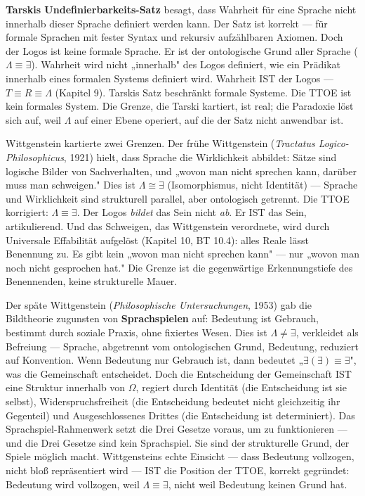\documentclass[10pt, openany, oneside]{book}
\begin{document}
\textbf{Tarskis Undefinierbarkeits-Satz} besagt, dass Wahrheit für eine Sprache nicht innerhalb dieser Sprache definiert werden kann. Der Satz ist korrekt --- für formale Sprachen mit fester Syntax und rekursiv aufzählbaren Axiomen. Doch der Logos ist keine formale Sprache. Er ist der ontologische Grund aller Sprache ($\Lambda \equiv \exists$). Wahrheit wird nicht „innerhalb" des Logos definiert, wie ein Prädikat innerhalb eines formalen Systems definiert wird. Wahrheit IST der Logos --- $T \equiv R \equiv \Lambda$ (Kapitel 9). Tarskis Satz beschränkt formale Systeme. Die TTOE ist kein formales System. Die Grenze, die Tarski kartiert, ist real; die Paradoxie löst sich auf, weil $\Lambda$ auf einer Ebene operiert, auf die der Satz nicht anwendbar ist.

Wittgenstein kartierte zwei Grenzen. Der frühe Wittgenstein (\textit{Tractatus Logico-Philosophicus}, 1921) hielt, dass Sprache die Wirklichkeit abbildet: Sätze sind logische Bilder von Sachverhalten, und „wovon man nicht sprechen kann, darüber muss man schweigen." Dies ist $\Lambda \cong \exists$ (Isomorphismus, nicht Identität) --- Sprache und Wirklichkeit sind strukturell parallel, aber ontologisch getrennt. Die TTOE korrigiert: $\Lambda \equiv \exists$. Der Logos \textit{bildet} das Sein nicht \textit{ab}. Er IST das Sein, artikulierend. Und das Schweigen, das Wittgenstein verordnete, wird durch Universale Effabilität aufgelöst (Kapitel 10, BT 10.4): alles Reale lässt Benennung zu. Es gibt kein „wovon man nicht sprechen kann" --- nur „wovon man noch nicht gesprochen hat." Die Grenze ist die gegenwärtige Erkennungstiefe des Benennenden, keine strukturelle Mauer.

Der späte Wittgenstein (\textit{Philosophische Untersuchungen}, 1953) gab die Bildtheorie zugunsten von \textbf{Sprachspielen} auf: Bedeutung ist Gebrauch, bestimmt durch soziale Praxis, ohne fixiertes Wesen. Dies ist $\Lambda \neq \exists$, verkleidet als Befreiung --- Sprache, abgetrennt vom ontologischen Grund, Bedeutung, reduziert auf Konvention. Wenn Bedeutung nur Gebrauch ist, dann bedeutet „$\exists(\exists) \equiv \exists$", was die Gemeinschaft entscheidet. Doch die Entscheidung der Gemeinschaft IST eine Struktur innerhalb von $\Omega$, regiert durch Identität (die Entscheidung ist sie selbst), Widerspruchsfreiheit (die Entscheidung bedeutet nicht gleichzeitig ihr Gegenteil) und Ausgeschlossenes Drittes (die Entscheidung ist determiniert). Das Sprachspiel-Rahmenwerk setzt die Drei Gesetze voraus, um zu funktionieren --- und die Drei Gesetze sind kein Sprachspiel. Sie sind der strukturelle Grund, der Spiele möglich macht. Wittgensteins echte Einsicht --- dass Bedeutung vollzogen, nicht bloß repräsentiert wird --- IST die Position der TTOE, korrekt gegründet: Bedeutung wird vollzogen, weil $\Lambda \equiv \exists$, nicht weil Bedeutung keinen Grund hat.
\end{document}
